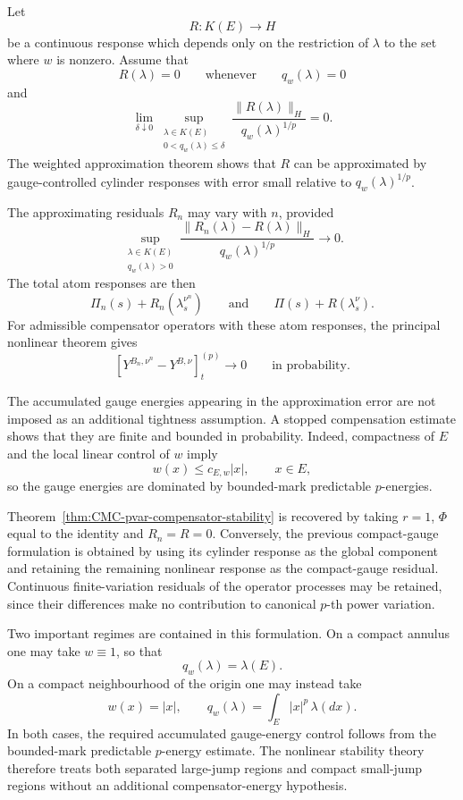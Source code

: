 \documentclass[a4paper,10pt]{article}
\begin{document}
Let
\[
        R:K(E)\longrightarrow H
\]
be a continuous response which depends only on the restriction of
\(\lambda\) to the set where \(w\) is nonzero. Assume that
\[
        R(\lambda)=0
        \qquad\text{whenever}\qquad
        q_w(\lambda)=0
\]
and
\[
\lim_{\delta\downarrow0}
\sup_{\substack{\lambda\in K(E)\\
                 0<q_w(\lambda)\le\delta}}
\frac{\lVert R(\lambda)\rVert_H}
     {q_w(\lambda)^{1/p}}
=
0.
\]
The weighted approximation theorem shows that \(R\) can be
approximated by gauge-controlled cylinder responses with error small
relative to \(q_w(\lambda)^{1/p}\).

The approximating residuals \(R_n\) may vary with \(n\), provided
\[
\sup_{\substack{\lambda\in K(E)\\q_w(\lambda)>0}}
\frac{\lVert R_n(\lambda)-R(\lambda)\rVert_H}
     {q_w(\lambda)^{1/p}}
\longrightarrow0.
\]
The total atom responses are then
\[
        \Pi_n(s)+R_n(\lambda_s^{\nu^n})
        \qquad\text{and}\qquad
        \Pi(s)+R(\lambda_s^\nu).
\]
For admissible compensator operators with these atom responses, the
principal nonlinear theorem gives
\[
        [Y^{B_n,\nu^n}-Y^{B,\nu}]^{(p)}_t
        \longrightarrow0
        \qquad\text{in probability}.
\]

The accumulated gauge energies appearing in the approximation error
are not imposed as an additional tightness assumption. A stopped
compensation estimate shows that they are finite and bounded in
probability. Indeed, compactness of \(E\) and the local linear control
of \(w\) imply
\[
        w(x)\le c_{E,w}|x|,
        \qquad x\in E,
\]
so the gauge energies are dominated by bounded-mark predictable
\(p\)-energies.

Theorem~\ref{thm:CMC-pvar-compensator-stability} is recovered by
taking \(r=1\), \(\Phi\) equal to the identity and \(R_n=R=0\).
Conversely, the previous compact-gauge formulation is obtained by
using its cylinder response as the global component and retaining the
remaining nonlinear response as the compact-gauge residual.
Continuous finite-variation residuals of the operator processes may
be retained, since their differences make no contribution to
canonical \(p\)-th power variation.

Two important regimes are contained in this formulation. On a compact
annulus one may take \(w\equiv1\), so that
\[
        q_w(\lambda)=\lambda(E).
\]
On a compact neighbourhood of the origin one may instead take
\[
        w(x)=|x|,
        \qquad
        q_w(\lambda)=\int_E|x|^p\,\lambda(dx).
\]
In both cases, the required accumulated gauge-energy control follows
from the bounded-mark predictable \(p\)-energy estimate. The nonlinear
stability theory therefore treats both separated large-jump regions
and compact small-jump regions without an additional compensator-energy
hypothesis.
\end{document}
